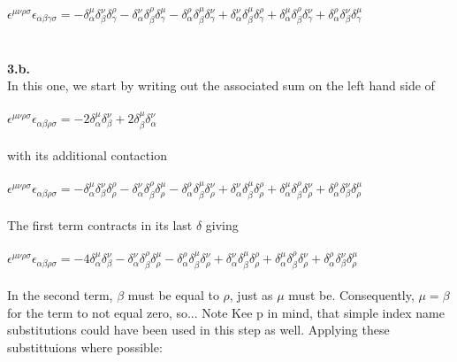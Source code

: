 \documentclass[prb,preprint]
{revtex4-1}
\newcommand{\PRLsep}{\noindent\makebox[\linewidth]{\resizebox{0.8888\linewidth}{2pt}{$\bullet$}}\bigskip}
\begin{document}
\\
\\
$\epsilon^{\mu\nu\rho\sigma}\epsilon_{\alpha\beta\gamma\sigma} = -\delta^\mu_\alpha \delta^\nu_\beta \delta^\rho_\gamma - \delta^\nu_\alpha \delta^\rho_\beta \delta^\mu_\gamma - \delta^\rho_\alpha \delta^\mu_\beta \delta^\nu_\gamma + \delta^\nu_\alpha \delta^\mu_\beta \delta^\rho_\gamma + \delta^\mu_\alpha \delta^\rho_\beta \delta^\nu_\gamma + \delta^\rho_\alpha \delta^\nu_\beta \delta^\mu_\gamma$
\\
\PRLsep
\\
\\
\textbf{3.b.}
\\
In this one,  we start by writing out the associated sum on the left hand side of 
\\
\\
$\epsilon^{\mu\nu\rho\sigma}\epsilon_{\alpha\beta\rho\sigma} = -2\delta^\mu_\alpha\delta^\nu_\beta + 2\delta^\mu_\beta\delta^\nu_\alpha$
\\
\\
with its additional contaction
\\
\\
$\epsilon^{\mu\nu\rho\sigma}\epsilon_{\alpha\beta\rho\sigma} = -\delta^\mu_\alpha \delta^\nu_\beta \delta^\rho_\rho - \delta^\nu_\alpha \delta^\rho_\beta \delta^\mu_\rho - \delta^\rho_\alpha \delta^\mu_\beta \delta^\nu_\rho + \delta^\nu_\alpha \delta^\mu_\beta \delta^\rho_\rho + \delta^\mu_\alpha \delta^\rho_\beta \delta^\nu_\rho + \delta^\rho_\alpha \delta^\nu_\beta \delta^\mu_\rho$
\\
\\
The first term contracts in its last $\delta$ giving 
\\
\\
$\epsilon^{\mu\nu\rho\sigma}\epsilon_{\alpha\beta\rho\sigma} = -4\delta^\mu_\alpha \delta^\nu_\beta - \delta^\nu_\alpha \delta^\rho_\beta \delta^\mu_\rho - \delta^\rho_\alpha \delta^\mu_\beta \delta^\nu_\rho + \delta^\nu_\alpha \delta^\mu_\beta \delta^\rho_\rho + \delta^\mu_\alpha \delta^\rho_\beta \delta^\nu_\rho + \delta^\rho_\alpha \delta^\nu_\beta \delta^\mu_\rho$
\\
\\
In the second term, $\beta$ must be equal to $\rho$, just as $\mu$ must be.  Consequently, $\mu = \beta$ for the term to not equal zero, so...  Note Kee p in mind, that simple index name substitutions could have been used in this step as well.  Applying these substittuions where possible:
\\
\\
\end{document}
